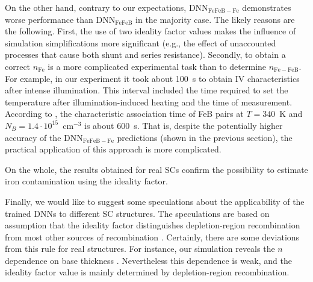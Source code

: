 \documentclass[num-refs]{wiley-article} %
\begin{document}
On the other hand, contrary to our expectations, DNN$_\mathrm{FeFeB-Fe}$ demonstrates worse performance
than DNN$_\mathrm{FeFeB}$ in the majority case.
The likely reasons are the following.
First, the use of two ideality factor values makes the influence of simulation simplifications more significant
(e.g., the effect of unaccounted processes that cause both shunt and series resistance).
Secondly, to obtain a correct $n_\mathrm{Fe}$ is a more complicated experimental task than to determine $n_\mathrm{Fe-FeB}$.
For example, in our experiment it took about 100~s to obtain IV characteristics after intense illumination.
This interval included the time required to set the temperature after illumination-induced heating and the time of measurement.
According to \cite{FeBAssJAP2014,FeBKin2019}, the characteristic association time of FeB pairs
at $T=340$~K and $N_B=1.4\cdot10^{15}$~cm$^{-3}$ is about 600~s.
That is, despite the potentially higher accuracy of the DNN$_\mathrm{FeFeB-Fe}$ predictions
(shown in the previous section), the practical application of this approach is more complicated.

On the whole, the results obtained for real SCs confirm the possibility to estimate iron contamination using the ideality factor.

Finally, we would like to suggest some speculations about the applicability of the trained DNNs to different SC structures.
The speculations are based on assumption that the ideality factor distinguishes
depletion-region recombination from most other sources of recombination \cite{Breitenstein2013,n2McIntosh}.
Certainly, there are some deviations from this rule for real structures.
For instance, our simulation reveals the $n$ dependence on base thickness \cite{OlikhJPS}.
Nevertheless this dependence is weak, and the ideality factor value is mainly determined
by depletion-region recombination.
\end{document}
